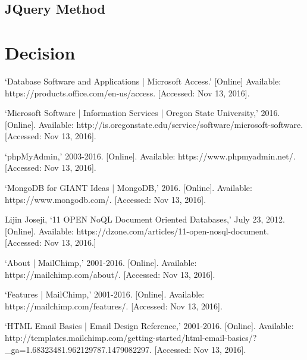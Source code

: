 \documentclass{IEEEtran}
\begin{document}
\subsection{JQuery Method} %

\section{Decision}


\begin{thebibliography}{99} %

`Database Software and Applications | Microsoft Access.' [Online] Available: https://products.office.com/en-us/access. [Accessed: Nov 13, 2016].

`Microsoft Software | Information Services | Oregon State University,' 2016. [Online]. Available: http://is.oregonstate.edu/service/software/microsoft-software. [Accessed: Nov 13, 2016].

`phpMyAdmin,' 2003-2016. [Online]. Available: https://www.phpmyadmin.net/. [Accessed: Nov 13, 2016].

`MongoDB for GIANT Ideas | MongoDB,' 2016. [Online]. Available: https://www.mongodb.com/. [Accessed: Nov 13, 2016].

Lijin Joseji, `11 OPEN NoQL Document Oriented Databases,' July 23, 2012. [Online]. Available: https://dzone.com/articles/11-open-nosql-document. [Accessed: Nov 13, 2016.]

`About | MailChimp,' 2001-2016. [Online]. Available: https://mailchimp.com/about/. [Accessed: Nov 13, 2016]. 

`Features | MailChimp,' 2001-2016. [Online]. Available: https://mailchimp.com/features/. [Accessed: Nov 13, 2016].

`HTML Email Basics | Email Design Reference,' 2001-2016. [Online]. Available: http://templates.mailchimp.com/getting-started/html-email-basics/?\_ga=1.68323481.962129787.1479082297. [Accessed: Nov 13, 2016].

\end{thebibliography}
\end{document}
